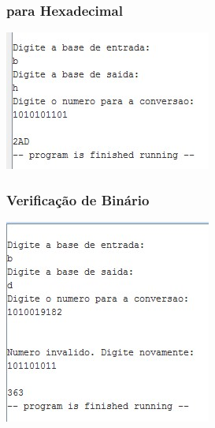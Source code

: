 \documentclass[10pt,a4paper]{article}
\begin{document}
\begin{figure}[H]
\begin{minipage}[t]{.5\textwidth}
\subsubsection{para Hexadecimal}
\includegraphics[width=\textwidth]{BH.jpg}
\end{minipage}
\begin{minipage}[t]{.5\textwidth}
\subsubsection{Verificação de Binário}
\includegraphics[width=\textwidth]{BinFail.jpg}
\end{minipage}
\end{figure}
\newpage
\end{document}
